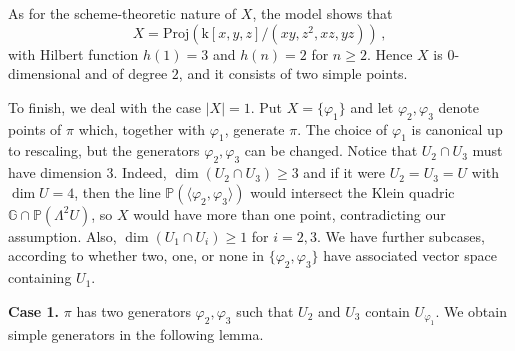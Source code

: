 \documentclass[10pt,reqno]{amsart}
\newcommand{\la}{\langle}
\newcommand{\ra}{\rangle}
\newcommand{\GG}{\mathbb{G}}
\newcommand{\PP}{\mathbb P}
\renewcommand{\a}{\alpha}
\renewcommand{\b}{\beta}
\newcommand{\f}{\varphi}
\renewcommand{\L}{\Lambda}
\newcommand{\kk}{\mathrm{k}}
\theoremstyle{definition}
\begin{document}


\noindent As for the scheme-theoretic nature of $X$, the model shows that 
\[
X=\mathrm{Proj}(\kk[x,y,z]/(xy,z^2,xz,yz))\,,
\]
with Hilbert function $h(1)=3$ and $h(n)=2$ for $n \ge 2$. Hence $X$ is 0-dimensional and of degree $2$, and it consists of two simple points. 

\medskip

\noindent To finish, we deal with the case $|X|=1$. Put $X=\{\f_1\}$ and let $\f_2, \f_3$ denote points of $\pi$ which, together with $\f_1$, generate $\pi$. The choice of $\f_1$ is canonical up to rescaling, but the generators $\f_2, \f_3$ can be changed. Notice that $U_2 \cap U_3$ must have dimension $3$. Indeed, $\dim(U_2\cap U_3)\geq 3$ and if it were $U_2=U_3=U$ with $\dim U=4$, then the line $\PP(\la \f_2, \f_3 \ra)$ would intersect the Klein quadric $\GG \cap \PP(\L^2 U)$, so $X$ would have more than one point, contradicting our assumption.
Also, $\dim(U_1\cap U_i)\geq 1$ for $i=2,3$. We have further subcases, according to whether two, one, or none in $\{\f_2, \f_3\}$ have associated vector space containing $U_1$.

\noindent \textbf{Case 1.} $\pi$ has two generators $\f_2, \f_3$ such that $U_2$ and $U_3$ contain $U_{\f_1}$. We obtain simple generators in the following lemma.
\end{document}
